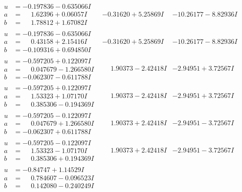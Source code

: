 \documentclass[1p]{elsarticle_modified}
\theoremstyle{definition}
\begin{document}
$$\begin{array}{c|c|c}
\begin{aligned}
u &= -0.197836 - 0.635066 I \\
a &= \phantom{-}1.62396 + 0.06057 I \\
b &= \phantom{-}1.78812 + 1.67082 I\end{aligned}
 & -0.31620 + 5.25869 I & -10.26177 - 8.82936 I \\ \hline\begin{aligned}
u &= -0.197836 - 0.635066 I \\
a &= \phantom{-}0.43158 + 2.15416 I \\
b &= -0.109316 + 0.694850 I\end{aligned}
 & -0.31620 + 5.25869 I & -10.26177 - 8.82936 I \\ \hline\begin{aligned}
u &= -0.597205 + 0.122097 I \\
a &= \phantom{-}0.047679 - 1.266580 I \\
b &= -0.062307 - 0.611788 I\end{aligned}
 & \phantom{-}1.90373 - 2.42418 I & -2.94951 + 3.72567 I \\ \hline\begin{aligned}
u &= -0.597205 + 0.122097 I \\
a &= \phantom{-}1.53323 + 1.07170 I \\
b &= \phantom{-}0.385306 - 0.194369 I\end{aligned}
 & \phantom{-}1.90373 - 2.42418 I & -2.94951 + 3.72567 I \\ \hline\begin{aligned}
u &= -0.597205 - 0.122097 I \\
a &= \phantom{-}0.047679 + 1.266580 I \\
b &= -0.062307 + 0.611788 I\end{aligned}
 & \phantom{-}1.90373 + 2.42418 I & -2.94951 - 3.72567 I \\ \hline\begin{aligned}
u &= -0.597205 - 0.122097 I \\
a &= \phantom{-}1.53323 - 1.07170 I \\
b &= \phantom{-}0.385306 + 0.194369 I\end{aligned}
 & \phantom{-}1.90373 + 2.42418 I & -2.94951 - 3.72567 I \\ \hline\begin{aligned}
u &= -0.84747 + 1.14529 I \\
a &= \phantom{-}0.784607 - 0.096523 I \\
b &= \phantom{-}0.142080 - 0.240249 I\end{aligned}

\end{array}$$
\end{document}
